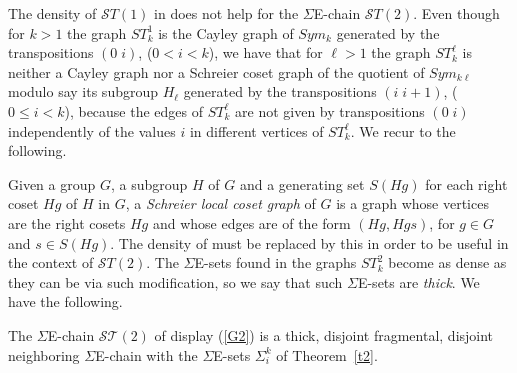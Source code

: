 \documentclass[12pt,reqno]{article}
\begin{document}
\begin{remark}\label{Sch}
The density of ${\mathcal ST}(1)$ in \cite{D73} does not help for the $\Sigma$E-chain ${\mathcal ST}(2)$. 
Even though for $k>1$ the graph $ST^1_k$ is the Cayley graph of $Sym_k$ generated by the transpositions $(0\;i)$, ($0<i<k$), we have that for $\ell>1$ the graph
$ST^\ell_k$ is neither a Cayley graph nor a Schreier coset graph of the quotient of $Sym_{k\ell}$ modulo say its subgroup $H_\ell$ generated by the transpositions $(i\;i+1)$, ($0\le i<k$), because the edges of $ST^\ell_k$ are not given by transpositions $(0\;i)$ independently of the values $i$ in different vertices of $ST^\ell_k$. We recur to the following. 
\end{remark}

Given a group $G$, a subgroup $H$ of $G$ and a generating set $S(Hg)$ for each right coset $Hg$ of $H$ in $G$, a {\it Schreier local coset graph} of $G$ is a graph whose vertices are the right cosets $Hg$ and whose edges are of the form $(Hg,Hgs)$, for $g\in G$ and $s\in S(Hg)$.  
 The density of \cite{D73} must be replaced by this in order to be useful in the context of ${\mathcal ST}(2)$. The $\Sigma$E-sets found in the graphs $ST^2_k$ become
 as dense as they can be via such modification, so we say that such $\Sigma$E-sets are {\it thick}. We have the following.

\begin{theorem} 
The $\Sigma$E-chain ${\mathcal{ST}}(2)$  of display (\ref{G2}) is  a thick, disjoint fragmental, disjoint neighboring $\Sigma$E-chain with the $\Sigma$E-sets $\Sigma_i^k$ of Theorem~\ref{t2}.
\end{theorem}
\end{document}
